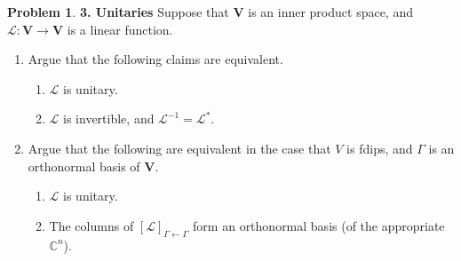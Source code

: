 \documentclass{book}
\theoremstyle{definition}
\newtheorem*{prob*}{Problem}
\newcommand{\V}{\mathbf{V}}
\newcommand{\lag}{\mathcal{L}}
\begin{document}
\begin{prob*}\textbf{3. Unitaries}
	Suppose that $\V$ is an inner product space, and $\lag : \V \to \V$ is a linear function. 
	\begin{enumerate}
		\item Argue that the following claims are equivalent.
		\begin{enumerate}
			\item $\lag$ is unitary.
			\item $\lag$ is invertible, and $\lag^{-1} = \lag^*$.
		\end{enumerate}
	
		\item Argue that the following are equivalent in the case that $V$ is fdips, and $\Gamma$ is an orthonormal basis of $\V$.
		\begin{enumerate}
			\item $\lag$ is unitary.
			\item The columns of $[\lag]_{\Gamma\leftarrow\Gamma}$ form an orthonormal basis (of the appropriate $\mathbb{C}^n$).
		\end{enumerate}
	\end{enumerate}
\end{prob*}





\newpage
\end{document}
